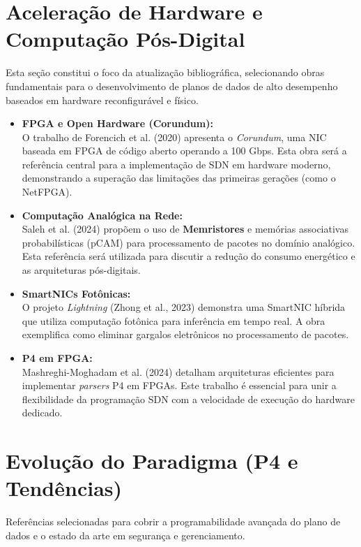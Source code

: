 \documentclass[10pt]{IEEEtran}
\begin{document}
\section{Aceleração de Hardware e Computação Pós-Digital}
Esta seção constitui o foco da atualização bibliográfica, selecionando obras fundamentais para o desenvolvimento de planos de dados de alto desempenho baseados em hardware reconfigurável e físico.

\begin{itemize}
    \item \cite{Forencich:Corundum} \textbf{FPGA e Open Hardware (Corundum):} \\
    O trabalho de Forencich et al. (2020) apresenta o \textit{Corundum}, uma NIC baseada em FPGA de código aberto operando a 100 Gbps. Esta obra será a referência central para a implementação de SDN em hardware moderno, demonstrando a superação das limitações das primeiras gerações (como o NetFPGA).
    
    \item \cite{Saleh:AnalogINC} \textbf{Computação Analógica na Rede:} \\
    Saleh et al. (2024) propõem o uso de \textbf{Memristores} e memórias associativas probabilísticas (pCAM) para processamento de pacotes no domínio analógico. Esta referência será utilizada para discutir a redução do consumo energético e as arquiteturas pós-digitais.
    
    \item \cite{Zhong:Lightning} \textbf{SmartNICs Fotônicas:} \\
    O projeto \textit{Lightning} (Zhong et al., 2023) demonstra uma SmartNIC híbrida que utiliza computação fotônica para inferência em tempo real. A obra exemplifica como eliminar gargalos eletrônicos no processamento de pacotes.

    \item \cite{Mashreghi:PrismParser} \textbf{P4 em FPGA:} \\
    Mashreghi-Moghadam et al. (2024) detalham arquiteturas eficientes para implementar \textit{parsers} P4 em FPGAs. Este trabalho é essencial para unir a flexibilidade da programação SDN com a velocidade de execução do hardware dedicado.
\end{itemize}

\section{Evolução do Paradigma (P4 e Tendências)}
Referências selecionadas para cobrir a programabilidade avançada do plano de dados e o estado da arte em segurança e gerenciamento.
\end{document}
